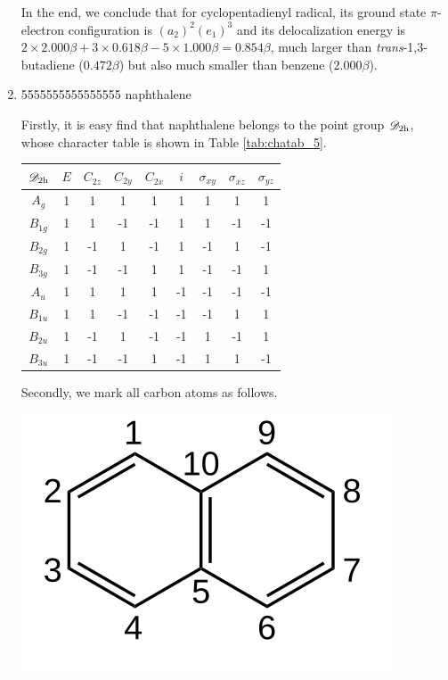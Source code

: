 \documentclass[a4paper]{book}
\newcommand\Tableref[1]{Table \ref{#1}}
\begin{document}
\begin{solution}
\begin{enumerate}[label=(\alph*)]
		In the end, we conclude that for cyclopentadienyl radical, its ground state $\pi$-electron configuration is $(a_2)^2(e_1)^3$ and its delocalization energy is $2 \times 2.000 \beta + 3 \times 0.618 \beta - 5 \times 1.000 \beta = 0.854 \beta$, much larger than {\it trans}-1,3-butadiene ($0.472\beta$) but also much smaller than benzene ($2.000\beta$). 
		
		\item 5555555555555555   naphthalene
		
		Firstly, it is easy find that naphthalene belongs to the point group $\mathscr{D}_{\rm 2h}$, whose character table is shown in \Tableref{tab:chatab_5}.		
		\begin{center}
		\setlength{\abovecaptionskip}{0em}
		\label{tab:chatab_5}
		\begin{tabular}{ccccccccc}\hline
	$\mathscr{D}_{\rm 2h}$ & $E$ & $C_{2z}$ &	$C_{2y}$	& $C_{2x}$	&	$i$	&	$\sigma_{xy}$	&	$\sigma_{xz}$ &	$\sigma_{yz}$\\ \hline
			$A_g$		&	1	&	1	&	1	&	1	&	1	&	1	&	1	&	1	\\
			$B_{1g}$	&	1	&	1	&	-1	&	-1	&	1	&	1	&	-1	&	-1	\\
			$B_{2g}$ 	&	1	&	-1	&	1	&	-1	&	1	&	-1	&	1	&	-1	\\
			$B_{3g}$ 	&	1	&	-1	&	-1	&	1	&	1	&	-1	&	-1	&	1	\\ 
			$A_u$		&	1	&	1	&	1	&	1	&	-1	&	-1	&	-1	&	-1	\\
			$B_{1u}$	&	1	&	1	&	-1	&	-1	&	-1	&	-1	&	1	&	1	\\
			$B_{2u}$ 	&	1	&	-1	&	1	&	-1	&	-1	&	1	&	-1	&	1	\\
			$B_{3u}$ 	&	1	&	-1	&	-1	&	1	&	-1	&	1	&	1	&	-1	\\ \hline
		\end{tabular}
		\end{center}
		
		Secondly, we mark all carbon atoms as follows.
		\begin{center}
		\includegraphics[scale=1.0]{./structures/exercise_1/naphthalene/0.png}
		\setlength{\abovecaptionskip}{-0.3em}
		\setlength{\belowcaptionskip}{-0.8em}
		\end{center}	
		

\end{enumerate}
\end{solution}
\end{document}
